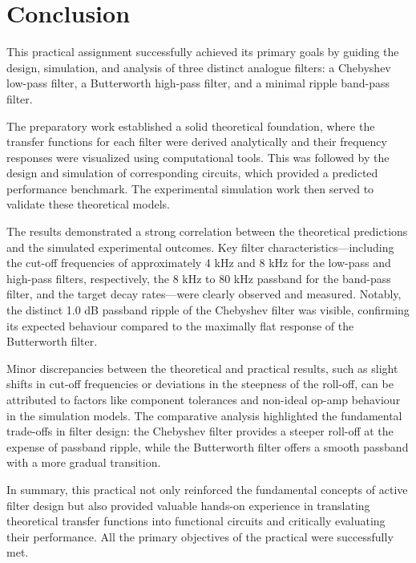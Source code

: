 \documentclass[a4paper, onecolumn, 12pt]{IEEEtran}
\begin{document}
\newpage
\section{Conclusion}
\label{sec:conclusion}

This practical assignment successfully achieved its primary goals by guiding the design, simulation, and analysis of three distinct analogue filters: a Chebyshev low-pass filter, a Butterworth high-pass filter, and a minimal ripple band-pass filter.

The preparatory work established a solid theoretical foundation, where the transfer functions for each filter were derived analytically and their frequency responses were visualized using computational tools. This was followed by the design and simulation of corresponding circuits, which provided a predicted performance benchmark. The experimental simulation work then served to validate these theoretical models.

The results demonstrated a strong correlation between the theoretical predictions and the simulated experimental outcomes. Key filter characteristics—including the cut-off frequencies of approximately 4 kHz and 8 kHz for the low-pass and high-pass filters, respectively, the 8 kHz to 80 kHz passband for the band-pass filter, and the target decay rates—were clearly observed and measured. Notably, the distinct 1.0 dB passband ripple of the Chebyshev filter was visible, confirming its expected behaviour compared to the maximally flat response of the Butterworth filter.

Minor discrepancies between the theoretical and practical results, such as slight shifts in cut-off frequencies or deviations in the steepness of the roll-off, can be attributed to factors like component tolerances and non-ideal op-amp behaviour in the simulation models. The comparative analysis highlighted the fundamental trade-offs in filter design: the Chebyshev filter provides a steeper roll-off at the expense of passband ripple, while the Butterworth filter offers a smooth passband with a more gradual transition.

In summary, this practical not only reinforced the fundamental concepts of active filter design but also provided valuable hands-on experience in translating theoretical transfer functions into functional circuits and critically evaluating their performance. All the primary objectives of the practical were successfully met.

\newpage

\IEEEtriggercmd{\normalsize}
\end{document}
